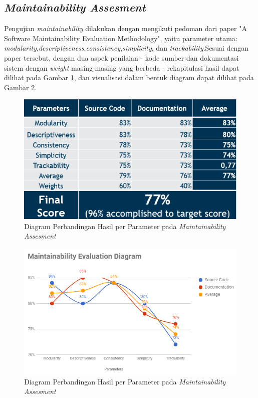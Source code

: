 \subsection{\textit{Maintainability Assesment}}
Pengujian \textit{maintainability} dilakukan dengan mengikuti pedoman dari paper "A Software Maintainability Evaluation Methodology"\cite{peercy_software_nodate}, yaitu parameter utama: \textit{modularity},\textit{descriptiveness},\textit{consistency},\textit{simplicity}, dan \textit{trackability}.Sesuai dengan paper tersebut, dengan dua aspek penilaian - kode sumber dan dokumentasi sistem dengan \textit{weight} masing-masing yang berbeda - rekapitulasi hasil dapat dilihat pada Gambar \ref{maintainability-recap}, dan visualisasi dalam bentuk diagram dapat dilihat pada Gambar \ref{maintainability-chart}.
\begin{figure}[h!]
	\centering
	\includegraphics[width=.45\textwidth]{images/bab5/maintainability/telor.png}
	\caption{Diagram Perbandingan Hasil per Parameter pada \textit{Maintainability Assesment}}
	\label{maintainability-recap}
\end{figure}
\begin{figure}[h!]
	\centering
	\includegraphics[width=.45\textwidth]{images/bab5/maintainability/maintainability-evaluation.png}
	\caption{Diagram Perbandingan Hasil per Parameter pada \textit{Maintainability Assesment}}
	\label{maintainability-chart}
\end{figure}
